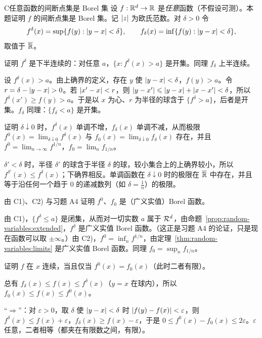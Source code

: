 \begin{probleme}{C}{任意函数的间断点集是 Borel 集}
设 $f:\mathbb{R}^d\to\mathbb{R}$ 是\emph{任意}函数（不假设可测）。本题证明 $f$ 的间断点集是 Borel 集。记 $\lvert z\rvert$ 为欧氏范数。对 $\delta>0$ 令
\[
f^\delta(x)=\sup\{f(y):\lvert y-x\rvert<\delta\},\qquad f_\delta(x)=\inf\{f(y):\lvert y-x\rvert<\delta\},
\]
取值于 $\overline{\mathbb{R}}$。
\begin{questions}
\item 证明 $f^\delta$ 是下半连续的：对任意 $a$，$\{x:f^\delta(x)>a\}$ 是开集。同理 $f_\delta$ 上半连续。
\begin{solution}
设 $f^\delta(x)>a$。由上确界的定义，存在 $y$ 使 $\lvert y-x\rvert<\delta$，$f(y)>a$。令 $r=\delta-\lvert y-x\rvert>0$。若 $\lvert x'-x\rvert<r$，则 $\lvert y-x'\rvert\leqslant\lvert y-x\rvert+\lvert x-x'\rvert<\delta$，所以 $f^\delta(x')\geqslant f(y)>a$。于是以 $x$ 为心、$r$ 为半径的球含于 $\{f^\delta>a\}$，后者是开集。$f_\delta$ 同理：$\{f_\delta<a\}$ 是开集。
\end{solution}
\item 证明 $\delta\downarrow0$ 时，$f^\delta(x)$ 单调不增，$f_\delta(x)$ 单调不减，从而极限 $f^0(x)=\lim_{\delta\downarrow0}f^\delta(x)$ 与 $f_0(x)=\lim_{\delta\downarrow0}f_\delta(x)$ 存在，并且 $f^0=\lim_{n\to\infty}f^{1/n}$，$f_0=\lim_nf_{1/n}$。
\begin{solution}
$\delta'<\delta$ 时，半径 $\delta'$ 的球含于半径 $\delta$ 的球，较小集合上的上确界较小，所以 $f^{\delta'}(x)\leqslant f^\delta(x)$；下确界相反。单调函数在 $\delta\downarrow0$ 时的极限在 $\overline{\mathbb{R}}$ 中存在，并且等于沿任何一个趋于 $0$ 的递减数列（如 $\delta=\frac1n$）的极限。
\end{solution}
\item 由 C1)、C2) 与习题 A4 证明 $f^0$、$f_0$ 是（广义实值）Borel 函数。
\begin{solution}
由 C1)，$\{f^\delta\leqslant a\}$ 是闭集，从而对一切实数 $a$ 属于 $\mathcal{R}^d$，由命题~\ref{prop:random-variables:extended}，$f^\delta$ 是广义实值 Borel 函数。（这正是习题 A4 的论证，只是现在函数可以取 $\pm\infty$。）由 C2)，$f^0=\inf_nf^{1/n}$，由定理~\ref{thm:random-variables:limits} 是广义实值 Borel 函数。同理 $f_0=\sup_nf_{1/n}$。
\end{solution}
\item 证明 $f$ 在 $x$ 连续，当且仅当 $f^0(x)=f_0(x)$（此时二者有限）。
\begin{solution}
总有 $f_\delta(x)\leqslant f(x)\leqslant f^\delta(x)$（$y=x$ 在球内），所以 $f_0(x)\leqslant f(x)\leqslant f^0(x)$。

“$\Rightarrow$”：对 $\varepsilon>0$，取 $\delta$ 使 $\lvert y-x\rvert<\delta$ 时 $\lvert f(y)-f(x)\rvert<\varepsilon$，则 $f^\delta(x)\leqslant f(x)+\varepsilon$，$f_\delta(x)\geqslant f(x)-\varepsilon$，于是 $0\leqslant f^0(x)-f_0(x)\leqslant2\varepsilon$。$\varepsilon$ 任意，二者相等（都夹在有限数之间，有限）。


\end{solution}
\end{questions}
\end{probleme}
